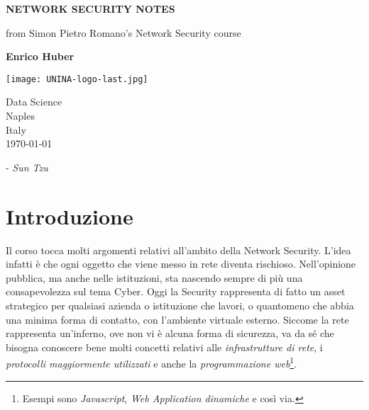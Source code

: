 \documentclass[14pt]{extreport}
\begin{document}
\begin{titlepage}
    \begin{center}
        \vspace*{1cm}
            
        \Huge
        \textbf{NETWORK SECURITY NOTES}
            
        \vspace{0.5cm}
        \LARGE
        from Simon Pietro Romano's Network Security course
            
        \vspace{1.5cm}
            
        \textbf{Enrico Huber}
            
        \vfill
            
        
            
        \vspace{0.8cm}
            
        \texttt{[image: UNINA-logo-last.jpg]}
            
        \Large
        Data Science\\
        Naples\\
        Italy\\
        \today
            
    \end{center}
\end{titlepage}
\newpage

\vspace*{\fill}
    \begin{center}
       - \textit{Sun Tzu}
    \end{center}
    \vspace*{\fill}%

\newpage

\tableofcontents\thispagestyle{empty}


\chapter*{Introduzione}
Il corso tocca molti argomenti relativi all'ambito della Network Security. L'idea infatti è che ogni oggetto che viene messo in rete diventa rischioso. Nell'opinione pubblica, ma anche nelle istituzioni, sta nascendo sempre di più una consapevolezza sul tema Cyber. Oggi la Security rappresenta di fatto un asset strategico per qualsiasi azienda o istituzione che lavori, o quantomeno che abbia una minima forma di contatto, con l'ambiente virtuale esterno.
Siccome la rete rappresenta un'inferno, ove non vi è alcuna forma di sicurezza, va da sé che bisogna conoscere bene molti concetti relativi alle \textit{infrastrutture di rete}, i \textit{protocolli maggiormente utilizzati} e anche la \textit{programmazione web}\footnote{Esempi sono \textit{Javascript}, \textit{Web Application dinamiche} e così via.}.\newline
\end{document}

